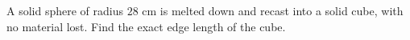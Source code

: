 A solid sphere of radius $28$ cm is melted down and recast into a solid cube, with no material lost. Find the exact edge length of the cube.
